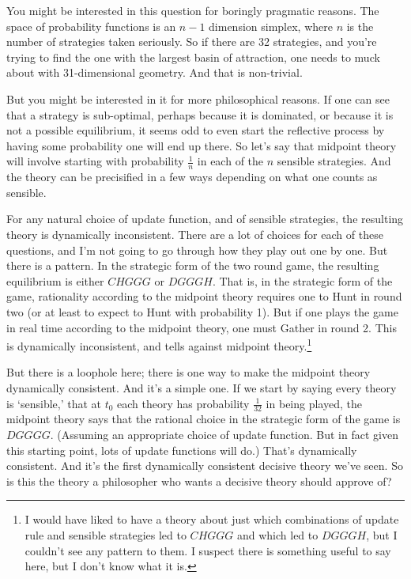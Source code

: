 \documentclass[
  12pt,
]{article}
\begin{document}
You might be interested in this question for boringly pragmatic reasons.
The space of probability functions is an \(n-1\) dimension simplex,
where \(n\) is the number of strategies taken seriously. So if there are
32 strategies, and you're trying to find the one with the largest basin
of attraction, one needs to muck about with 31-dimensional geometry. And
that is non-trivial.

But you might be interested in it for more philosophical reasons. If one
can see that a strategy is sub-optimal, perhaps because it is dominated,
or because it is not a possible equilibrium, it seems odd to even start
the reflective process by having some probability one will end up there.
So let's say that midpoint theory will involve starting with probability
\(\frac{1}{n}\) in each of the \(n\) sensible strategies. And the theory
can be precisified in a few ways depending on what one counts as
sensible.

For any natural choice of update function, and of sensible strategies,
the resulting theory is dynamically inconsistent. There are a lot of
choices for each of these questions, and I'm not going to go through how
they play out one by one. But there is a pattern. In the strategic form
of the two round game, the resulting equilibrium is either \(CHGGG\) or
\(DGGGH\). That is, in the strategic form of the game, rationality
according to the midpoint theory requires one to Hunt in round two (or
at least to expect to Hunt with probability 1). But if one plays the
game in real time according to the midpoint theory, one must Gather in
round 2. This is dynamically inconsistent, and tells against midpoint
theory.\footnote{I would have liked to have a theory about just which
  combinations of update rule and sensible strategies led to \(CHGGG\)
  and which led to \(DGGGH\), but I couldn't see any pattern to them. I
  suspect there is something useful to say here, but I don't know what
  it is.}

But there is a loophole here; there is one way to make the midpoint
theory dynamically consistent. And it's a simple one. If we start by
saying every theory is `sensible,' that at \(t_0\) each theory has
probability \(\frac{1}{32}\) in being played, the midpoint theory says
that the rational choice in the strategic form of the game is \(DGGGG\).
(Assuming an appropriate choice of update function. But in fact given
this starting point, lots of update functions will do.) That's
dynamically consistent. And it's the first dynamically consistent
decisive theory we've seen. So is this the theory a philosopher who
wants a decisive theory should approve of?
\end{document}
